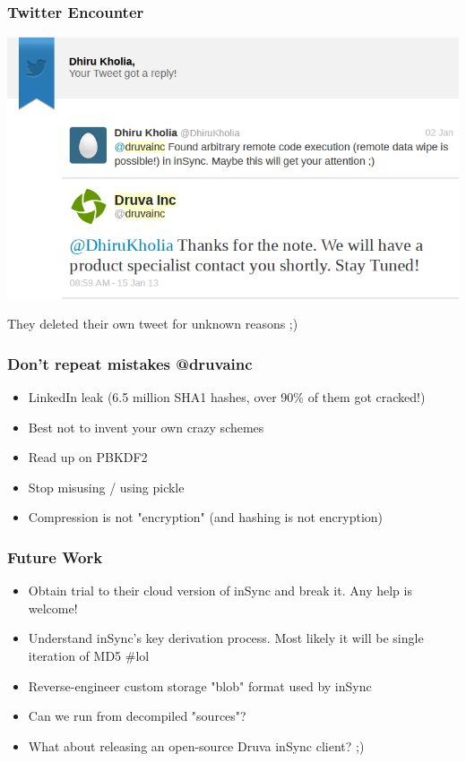 \documentclass{beamer}
\begin{document}
\begin{frame}
	\frametitle{Twitter Encounter}
	\begin{center}
		\includegraphics[scale=0.4]{twitter}
	\end{center}

	They deleted their own tweet for unknown reasons ;)

\end{frame}


\begin{frame}
	\frametitle{Don’t repeat mistakes @druvainc}
	\begin{itemize}
		\item LinkedIn leak (6.5 million SHA1 hashes, over 90\% of them got cracked!)
		\item Best not to invent your own crazy schemes
		\item Read up on PBKDF2
		\item Stop misusing / using pickle
		\item Compression is not "encryption" (and hashing is not encryption)
	\end{itemize}
\end{frame}

\begin{frame}
	\frametitle{Future Work}
	\begin{itemize}
		\item Obtain trial to their cloud version of inSync and
		break it. Any help is welcome!
		\item Understand inSync’s key derivation process.
		Most likely it will be single iteration of MD5 \#lol
		\item Reverse-engineer custom storage "blob" format used by inSync
		\item Can we run from decompiled "sources"?
		\item What about releasing an open-source Druva inSync client? ;)
	\end{itemize}
\end{frame}
\end{document}
